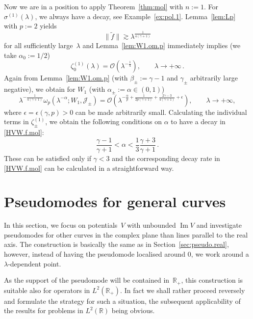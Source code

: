 \begin{Example}
Now we are in a position to apply Theorem~\ref{thm:mol} with $n:=1$. 
For $\sigma^{(1)}(\lambda)$, we always have a decay, 
see Example~\ref{ex:pol.1}.
Lemma~\ref{lem:Lp} with $p:=2$ yields 
\begin{equation}\label{f.estimate} 
\|\tilde f\| {\gtrsim} \lambda^{\frac{1}{4(\gamma+1)}}
\end{equation}
for all sufficiently large~$\lambda$ 
and Lemma~\ref{lem:W1.om.p} immediately implies (we take $\alpha_0:=1/2$)
\begin{equation}\label{zeta0.estimate}  
\zeta_0^{(1)}(\lambda) = {\mathcal{O}} \left( 
\lambda^{-\frac14} 
\right)
, \qquad
\lambda \to +\infty \,.
\end{equation}
Again from Lemma~\ref{lem:W1.om.p} (with $\beta_\pm:=\gamma-1$ 
and $\gamma_\pm$ arbitrarily large negative), we obtain for $W_1$ 
(with $\alpha_\pm:=\alpha \in (0,1)$)
\begin{equation}
\lambda^{- \frac{1}{4(\gamma+1)}}\omega_p(\lambda^{-\alpha}; W_1, {\mathcal J}_\pm) 
= 
{\mathcal{O}} \left( \lambda^{-\frac \alpha p + \frac{1}{2p(\gamma+1)} + \frac{2\gamma-3}{4(\gamma+1)} + \epsilon}  \right), \qquad \lambda \to +\infty,
\end{equation}
where $\epsilon=\epsilon(\gamma,p)>0$ can be made arbitrarily small.
Calculating the individual terms in $\zeta_{\pm}^{(1)}$, 
we obtain the following conditions on $\alpha$ to have a decay in \eqref{HVW.f.mol}:
\begin{equation}
\frac{\gamma-1}{\gamma+1}
< \alpha < 
\frac13 \frac{\gamma+3}{\gamma+1} 
\,.
\end{equation}
These can be satisfied only if $\gamma<3$ and the corresponding decay rate in \eqref{HVW.f.mol} can be calculated in a straightforward way.
\end{Example}

\section{Pseudomodes for general curves}
\label{sec:pseudo.gen}
In this section, we focus on potentials~$V$ with unbounded ${\operatorname{Im}} V$
and investigate pseudomodes for other curves in the complex plane
than lines parallel to the real axis. The construction is basically the same as in Section~\ref{sec:pseudo.real}, however, instead of having the pseudomode localised around $0$, we work around a $\lambda$-dependent point. 

As the support of the pseudomode will be contained in~${\mathbb{R}}_+$, 
this construction is suitable also for operators in $L^2({\mathbb{R}}_+)$. 
In fact we shall rather proceed reversely and formulate the strategy for such a situation, the subsequent applicability of the results for problems in $L^2({\mathbb{R}})$ being obvious. 

